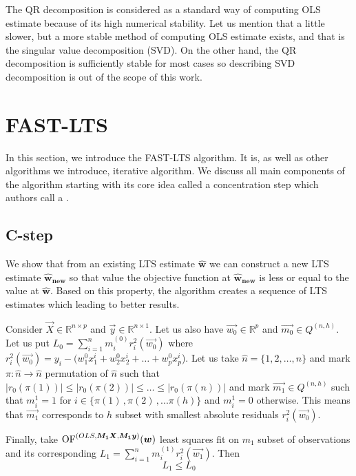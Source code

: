 The QR decomposition is considered as a standard way of computing OLS estimate because of its high numerical stability. Let us mention that a little slower, but a more stable method of computing OLS estimate exists, and that is the singular value decomposition (SVD). On the other hand, the QR decomposition is sufficiently stable for most cases so describing SVD decomposition is out of the scope of this work.








\section{FAST-LTS} \label{section_fast_lts}
In this section, we introduce the FAST-LTS algorithm\cite{rouss:2000}. 
It is, as well as other algorithms we introduce, iterative algorithm. We discuss all main components of the algorithm starting with its core idea called a concentration step which authors call a .

\subsection{C-step}
We show that from an existing LTS estimate $\boldsymbol{\hat{w}}$ we can construct a new LTS estimate $\boldsymbol{\hat{w}_{new}}$ so that value the objective function at $\boldsymbol{\hat{w}_{new}}$ is less or equal to the value at $\boldsymbol{\hat{w}}$. Based on this property, the algorithm creates a sequence of LTS estimates which leading to better results.



\begin{theorem}
Consider 
$\vec{X} \in \mathbb{R}^{n \times p}$ and 
$\vec{y} \in \mathbb{R}^{n \times 1}$.  
Let us also have $\vec{w_0}\in\mathbb{R}^p$ and $\vec{m_0} \in Q^{(n,h)}$. 
Let us put $L_0 = \sum\limits_{i=1}^n m^{(0)}_i r_{i}^2(\vec{w_0})$ where $r_{i}^2(\vec{w_0}) = y_i - (w_1^0x^i_1 + w_2^0x^i_2 +\ldots+ w_p^0x^i_p$).
Let us take $\hat{n} = \{{1,2,\ldots,n\}}$ and mark
$\pi: \hat{n} \rightarrow \hat{n}$ permutation of $\hat{n}$ such that $|r_0({\pi(1)})| \leq |r_0({\pi(2)})| \leq \ldots \leq |r_0({\pi(n)})|$
and mark   $\vec{m_1} \in Q^{(n,h)}$  such that $m^1_i = 1$ for $i \in \{{\pi(1)\,, \pi(2)\,,... \pi(h)\}}$ and  $m^1_i = 0$  otherwise. 
This means that  $\vec{m_1}$ corresponds to $h$ subset with smallest absolute residuals $r_{i}^2(\vec{w_0})$.

Finally, take
$\operatorname{OF}^{(OLS,\boldsymbol{M_1}\boldsymbol{X},  \boldsymbol{M_1}\boldsymbol{y} )} (\boldsymbol{w})$ least squares fit on $m_1$ subset of observations and its corresponding 
$L_1 = \sum\limits_{i=1}^n m^{(1)}_i r_{i}^2(\vec{w_1})$. Then
\begin{equation} 
    L_1  \leq L_0
\end{equation}
\end{theorem}


